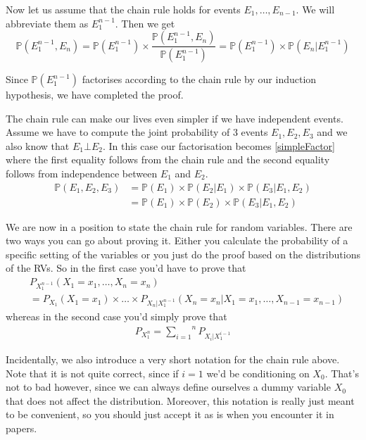 \documentclass[a4paper,11pt,leqno]{report}
\begin{document}
Now let us assume that the chain rule holds for events $ E_{1}, \ldots, E_{n-1} $. We will abbreviate them as $ E_{1}^{n-1} $. Then we get
\begin{equation}
\mathbb{P}(E_{1}^{n-1}, E_{n}) = \mathbb{P}(E_{1}^{n-1}) \times \dfrac{\mathbb{P}(E_{1}^{n-1}, E_{n})}{\mathbb{P}(E_{1}^{n-1})} 
= \mathbb{P}(E_{1}^{n-1}) \times \mathbb{P}(E_{n}|E_{1}^{n-1})
\end{equation}

Since $ \mathbb{P}(E_{1}^{n-1}) $ factorises according to the chain rule by our induction hypothesis, we have completed the proof.

The chain rule can make our lives even simpler if we have independent events. Assume we have to compute the joint probability of 3 events 
$ E_{1},E_{2},E_{3} $ and we also know that $ E_{1} \bot E_{2} $. In this case our factorisation becomes \ref{simpleFactor} where
the first equality follows from the chain rule and the second equality follows from independence between $ E_{1} $ and $ E_{2} $.
\begin{align} \label{simpleFactor}
\mathbb{P}(E_{1}, E_{2}, E_{3}) &= \mathbb{P}(E_{1}) \times \mathbb{P}(E_{2}|E_{1}) \times \mathbb{P}(E_{3}|E_{1},E_{2}) \\
&= \mathbb{P}(E_{1}) \times \mathbb{P}(E_{2}) \times \mathbb{P}(E_{3}|E_{1},E_{2}) \nonumber
\end{align}

We are now in a position to state the chain rule for random variables. There are two ways you can go about proving it. Either you 
calculate the probability of a specific setting of the variables or you just do the proof based on the distributions of the RVs.
So in the first case you'd have to prove that 
\begin{align*}
&P_{X_{1}^{n-1}}(X_{1} = x_{1}, \ldots, X_{n} = x_{n}) \\
&= P_{X_{1}}(X_{1} = x_{1}) \times \ldots \times P_{X_{n}|X_{1}^{n-1}}(X_{n} = x_{n}|X_{1}=x_{1}, \ldots, X_{n-1} = x_{n-1})
\end{align*}
whereas in the second case you'd simply prove that
\begin{align*}
P_{X_{1}^{n}} = \overset{n}{\underset{i=1}{\sum}}P_{X_{i}|X_{1}^{i-1}}
\end{align*}

Incidentally, we also introduce a very short notation for the chain rule above. Note that it is not quite correct, since if
$ i = 1 $ we'd be conditioning on $ X_{0} $. That's not to bad however, since we can always define ourselves a dummy variable
$ X_{0} $ that does not affect the distribution. Moreover, this notation is really just meant to be convenient, so you
should just accept it as is when you encounter it in papers.
\end{document}

